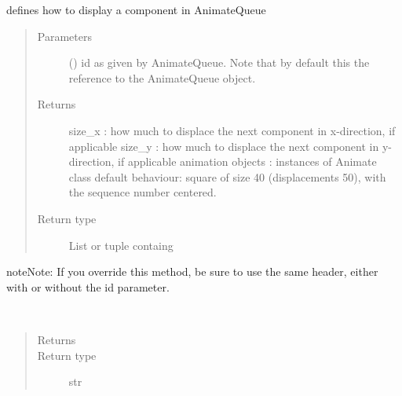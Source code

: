 \documentclass[letterpaper,10pt,english]{sphinxmanual}
\begin{document}
\begin{fulllineitems}
\begin{fulllineitems}
\end{fulllineitems}


\begin{fulllineitems}
\label{\detokenize{Reference:salabim.Component.animation_objects}}
defines how to display a component in AnimateQueue
\begin{quote}\begin{description}
\item[{Parameters}] \leavevmode
{} () \textendash{} id as given by AnimateQueue. Note that by default this the reference to the AnimateQueue object.

\item[{Returns}] \leavevmode
size\_x : how much to displace the next component in x-direction, if applicable 
size\_y : how much to displace the next component in y-direction, if applicable 
animation objects : instances of Animate class 
default behaviour: 
square of size 40 (displacements 50), with the sequence number centered.

\item[{Return type}] \leavevmode
List or tuple containg 

\end{description}\end{quote}

\begin{sphinxadmonition}{note}{Note:}
If you override this method, be sure to use the same header, either with or without the id parameter. 
\end{sphinxadmonition}

\end{fulllineitems}


\begin{fulllineitems}
\label{\detokenize{Reference:salabim.Component.base_name}}~\begin{quote}\begin{description}
\item[{Returns}] \leavevmode
{}

\item[{Return type}] \leavevmode
str


\end{description}
\end{quote}
\end{fulllineitems}
\end{fulllineitems}
\end{document}
